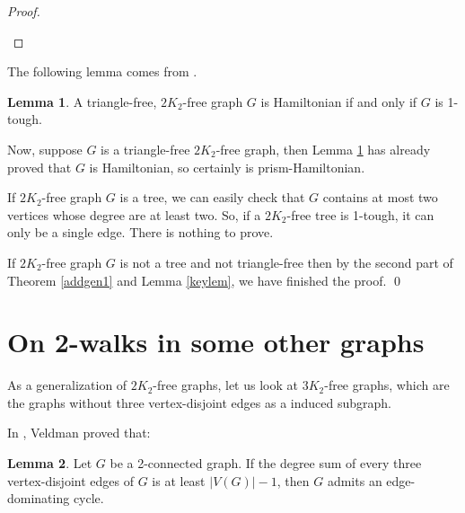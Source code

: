 \documentclass{amsart}
\theoremstyle{definition}
\newtheorem{lemma}{Lemma}
\begin{document}
\begin{proof}
\begin{figure}[h]
\begin{center}

\end{center}
\end{figure}


\end{proof}

The following lemma comes from \cite{broersma2014toughness}.
\begin{lemma}\cite[Theorem 4]{broersma2014toughness}\label{lembroet4}
A triangle-free, $2K_2$-free graph $G$ is Hamiltonian if and only if $G$ is 1-tough.
\end{lemma}

Now, suppose $G$ is a triangle-free $2K_2$-free graph, then Lemma \ref{lembroet4} has already proved that $G$ is Hamiltonian, so certainly is prism-Hamiltonian.

If $2K_2$-free graph $G$ is a tree, we can easily check that $G$ contains at most two vertices whose degree are at least two. So, if a $2K_2$-free tree is 1-tough, it can only be a single edge. There is nothing to prove.


If $2K_2$-free graph $G$ is not a tree and not triangle-free then by the second part of Theorem \ref{addgen1} and Lemma \ref{keylem}, we have finished the proof.
\qed











\section{On 2-walks in some other graphs}
As a generalization of $2K_2$-free graphs, let us look at $3K_2$-free graphs, which are the graphs without three vertex-disjoint edges as a induced subgraph.

In \cite{veldman83}, Veldman proved that:
\begin{lemma}\label{gen3k2de}{\cite[Corollary 3.2]{veldman83}}
Let $G$ be a 2-connected graph. If the degree sum of every three vertex-disjoint edges of $G$ is at least $|V(G)|-1$, then $G$ admits an edge-dominating cycle.
\end{lemma}
\end{document}
